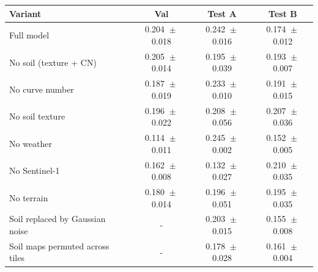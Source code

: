 \begin{tabular}{lccc}
\toprule
Variant & Val & Test A & Test B \\
\midrule
Full model
& 0.204%
${}\pm{}$0.018%
& 0.242%
${}\pm{}$0.016%
& 0.174%
${}\pm{}$0.012%
\\
No soil (texture + CN)
& 0.205%
${}\pm{}$0.014%
& 0.195%
${}\pm{}$0.039%
& 0.193%
${}\pm{}$0.007%
\\
No curve number
& 0.187%
${}\pm{}$0.019%
& 0.233%
${}\pm{}$0.010%
& 0.191%
${}\pm{}$0.015%
\\
No soil texture
& 0.196%
${}\pm{}$0.022%
& 0.208%
${}\pm{}$0.056%
& 0.207%
${}\pm{}$0.036%
\\
No weather
& 0.114%
${}\pm{}$0.011%
& 0.245%
${}\pm{}$0.002%
& 0.152%
${}\pm{}$0.005%
\\
No Sentinel-1
& 0.162%
${}\pm{}$0.008%
& 0.132%
${}\pm{}$0.027%
& 0.210%
${}\pm{}$0.035%
\\
No terrain
& 0.180%
${}\pm{}$0.014%
& 0.196%
${}\pm{}$0.051%
& 0.195%
${}\pm{}$0.035%
\\
\midrule
Soil replaced by Gaussian noise
& -
& 0.203%
${}\pm{}$0.015%
& 0.155%
${}\pm{}$0.008%
\\
Soil maps permuted across tiles
& -
& 0.178%
${}\pm{}$0.028%
& 0.161%
${}\pm{}$0.004%
\\
\bottomrule
\end{tabular}
